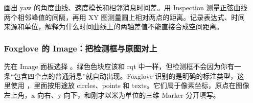 \begin{exercise}\label{ex:v2-ros-foxglove-plot}
画出 yaw 的角度曲线、速度模长和相邻消息时间差。用 Inspection 测量正弦曲线两个相邻峰值的间隔，再用 XY 图测量圆上相对两点的距离。记录表达式、时间来源和单位，解释为什么时间曲线上的两轴差值不能直接合成空间距离。
\end{exercise}

\subsubsection{Foxglove 的 Image：把检测框与原图对上}
\label{sec:ros2-image-annotations}

先在 Image 面板选择 。绿色色块应该和 rqt 中一样，但检测框不会因为你有一条“包含四个点的普通消息”就自动出现。Foxglove 识别的是明确的标注类型，这里使用 ，里面按用途放 circles、points 和 texts。它们属于像素坐标，原点在图像左上角，x 向右、y 向下，和刚才以米为单位的三维 Marker 分开填写。

